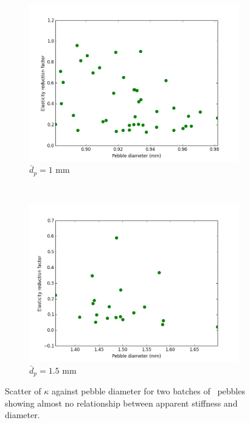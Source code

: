 \begin{figure}
        \centering
        \begin{subfigure}[b]{\doubleimagewidth}
                \includegraphics[width=\textwidth]{chapters/figures/nfri-1mm-kappa-dp-scatter.png}
                \caption{$\bar{d}_p = 1$ mm}
                \label{fig:nfri-1mm-kappa-dp-scatter}
        \end{subfigure}
        ~
        \begin{subfigure}[b]{\doubleimagewidth}
                \includegraphics[width=\textwidth]{chapters/figures/nfri-1.5mm-kappa-dp-scatter.png}
                \caption{$\bar{d}_p = 1.5$ mm}
                \label{fig:nfri-1.5mm-kappa-dp-scatter}
        \end{subfigure}
        \caption{Scatter of $\kappa$ against pebble diameter for two batches of \lit~pebbles showing almost no relationship between apparent stiffness and diameter.}\label{fig:nfri-kappa-dp-scatter}
\end{figure}

\FloatBarrier